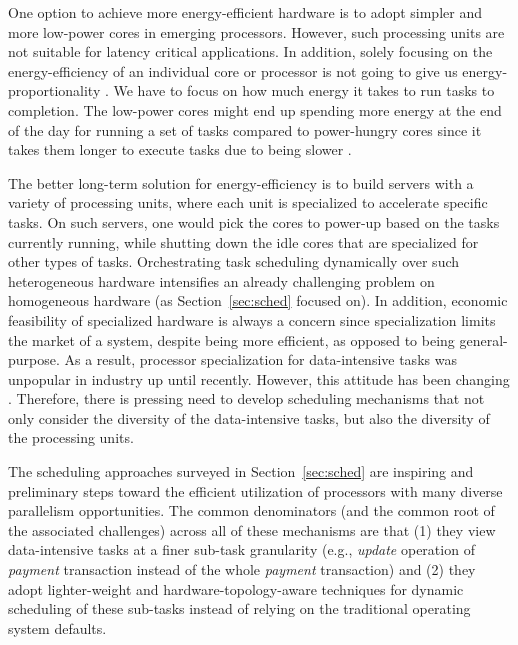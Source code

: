 \documentclass[11pt,dvipdfm]{article}
\newcommand{\refsec}[1]{Section~\ref{sec:#1}}
\begin{document}
One option to achieve more energy-efficient hardware is to adopt simpler and more low-power cores in emerging processors.
However, such processing units are not suitable for latency critical applications.
In addition, solely focusing on the energy-efficiency of an individual core or processor
is not going to give us energy-proportionality \cite{BarrosoH07}.
We have to focus on how much energy it takes to run tasks to completion.
The low-power cores might end up spending more energy at the end of the day for running a set of tasks 
compared to power-hungry cores since it takes them longer to execute tasks due to being slower \cite{LangPS10}.

The better long-term solution for energy-efficiency is to build servers with a variety of processing units,
where each unit is specialized to accelerate specific tasks.
On such servers, one would pick the cores to power-up based on the tasks currently running,
while shutting down the idle cores that are specialized for other types of tasks.
Orchestrating task scheduling dynamically over such heterogeneous hardware intensifies
an already challenging problem on homogeneous hardware (as \refsec{sched} focused on).
In addition, economic feasibility of specialized hardware is always a concern
since specialization limits the market of a system, despite being more efficient,
as opposed to being general-purpose.
%
As a result, processor specialization for data-intensive tasks was unpopular in industry up until recently.
However, this attitude has been changing \cite{AlonsoB18, HennessyP19}. %
Therefore, there is pressing need to develop scheduling mechanisms that not only consider
the diversity of the data-intensive tasks, but also the diversity of the processing units.

The scheduling approaches surveyed in \refsec{sched} are inspiring and preliminary steps
toward the efficient utilization of processors with many diverse parallelism opportunities.
The common denominators (and the common root of the associated challenges)
across all of these mechanisms are that
(1) they view data-intensive tasks at a finer sub-task granularity
(e.g., \textit{update} operation of \textit{payment} transaction instead of the whole \textit{payment} transaction)
and (2) they adopt lighter-weight and hardware-topology-aware techniques for dynamic scheduling of these sub-tasks
instead of relying on the traditional operating system defaults.
\end{document}
